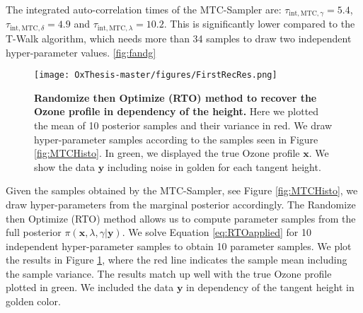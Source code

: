 The integrated auto-correlation times of the MTC-Sampler are: $\tau_{\text{int}, \text{MTC}, \gamma} = 5.4$, $\tau_{\text{int}, \text{MTC}, \delta} = 4.9$ and $\tau_{\text{int}, \text{MTC}, \lambda}= 10.2$.
This is significantly lower compared to the T-Walk algorithm, which needs more than 34 samples to draw two independent hyper-parameter values.
 \ref{fig:fandg}

\begin{figure}[htb]
\centering\texttt{[image: OxThesis-master/figures/FirstRecRes.png]} 
\caption[Randomize then Optimize (RTO) method to recover the Ozone profile in dependency of the height.]{\textbf{Randomize then Optimize (RTO) method to recover the Ozone profile in dependency of the height.} Here we plotted the mean of 10 posterior samples and their variance in red. We draw hyper-parameter samples according to the samples seen in Figure \ref{fig:MTCHisto}. In green, we displayed the true Ozone profile $\bm{x}$.
We show the data $\bm{y}$ including noise in golden for each tangent height.}
\label{fig:RecRes}
\end{figure}
Given the samples obtained by the MTC-Sampler, see Figure \ref{fig:MTCHisto}, we draw hyper-parameters from the marginal posterior accordingly.
The Randomize then Optimize (RTO) method allows us to compute parameter samples from the full posterior $\pi(\bm{x},\lambda, \gamma|\bm{y})$.
We solve Equation \ref{eq:RTOapplied} for 10 independent hyper-parameter samples to obtain 10 parameter samples.
We plot the results in Figure \ref{fig:RecRes}, where the red line indicates the sample mean including the sample variance.
The results match up well with the true Ozone profile plotted in green.
We included the data $\bm{y}$ in dependency of the tangent height in golden color.



